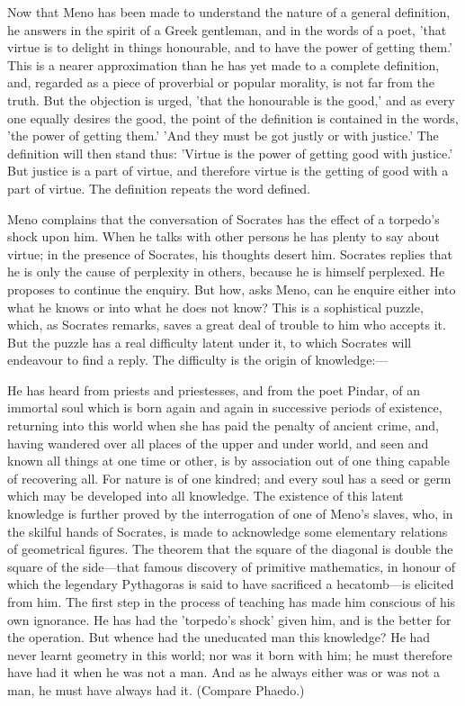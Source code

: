 \documentclass[11pt,letter]{article}
\begin{document}
\par  Now that Meno has been made to understand the nature of a general definition, he answers in the spirit of a Greek gentleman, and in the words of a poet, 'that virtue is to delight in things honourable, and to have the power of getting them.' This is a nearer approximation than he has yet made to a complete definition, and, regarded as a piece of proverbial or popular morality, is not far from the truth. But the objection is urged, 'that the honourable is the good,' and as every one equally desires the good, the point of the definition is contained in the words, 'the power of getting them.' 'And they must be got justly or with justice.' The definition will then stand thus: 'Virtue is the power of getting good with justice.' But justice is a part of virtue, and therefore virtue is the getting of good with a part of virtue. The definition repeats the word defined.

\par  Meno complains that the conversation of Socrates has the effect of a torpedo's shock upon him. When he talks with other persons he has plenty to say about virtue; in the presence of Socrates, his thoughts desert him. Socrates replies that he is only the cause of perplexity in others, because he is himself perplexed. He proposes to continue the enquiry. But how, asks Meno, can he enquire either into what he knows or into what he does not know? This is a sophistical puzzle, which, as Socrates remarks, saves a great deal of trouble to him who accepts it. But the puzzle has a real difficulty latent under it, to which Socrates will endeavour to find a reply. The difficulty is the origin of knowledge:—

\par  He has heard from priests and priestesses, and from the poet Pindar, of an immortal soul which is born again and again in successive periods of existence, returning into this world when she has paid the penalty of ancient crime, and, having wandered over all places of the upper and under world, and seen and known all things at one time or other, is by association out of one thing capable of recovering all. For nature is of one kindred; and every soul has a seed or germ which may be developed into all knowledge. The existence of this latent knowledge is further proved by the interrogation of one of Meno's slaves, who, in the skilful hands of Socrates, is made to acknowledge some elementary relations of geometrical figures. The theorem that the square of the diagonal is double the square of the side—that famous discovery of primitive mathematics, in honour of which the legendary Pythagoras is said to have sacrificed a hecatomb—is elicited from him. The first step in the process of teaching has made him conscious of his own ignorance. He has had the 'torpedo's shock' given him, and is the better for the operation. But whence had the uneducated man this knowledge? He had never learnt geometry in this world; nor was it born with him; he must therefore have had it when he was not a man. And as he always either was or was not a man, he must have always had it. (Compare Phaedo.)
\end{document}
